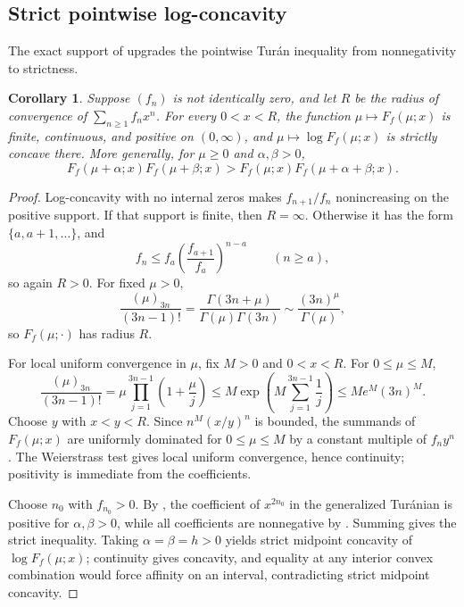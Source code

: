 \documentclass[11pt,a4paper]{amsart}
\numberwithin{equation}{section}
\theoremstyle{plain}
\newtheorem{corollary}[theorem]{Corollary}
\theoremstyle{definition}
\begin{document}
\subsection{Strict pointwise log-concavity}\label{subsec:strict-pointwise-log-concavity}

The exact support of  upgrades the pointwise Tur\'an inequality
from nonnegativity to strictness.

\begin{corollary}\label{cor:ordinary}
Suppose \((f_n)\) is not identically zero, and let \(R\) be the radius of
convergence of \(\sum_{n\ge1}f_nx^n\).  For every \(0<x<R\), the function
\(\mu\mapsto F_f(\mu;x)\) is finite, continuous, and positive on \((0,\infty)\),
and \(\mu\mapsto\log F_f(\mu;x)\) is strictly concave there.  More generally,
for \(\mu\ge0\) and \(\alpha,\beta>0\),
\[
 F_f(\mu+\alpha;x)F_f(\mu+\beta;x)
 >F_f(\mu;x)F_f(\mu+\alpha+\beta;x).
\]
\end{corollary}

\begin{proof}
Log-concavity with no internal zeros makes \(f_{n+1}/f_n\) nonincreasing on the
positive support.  If that support is finite, then \(R=\infty\).  Otherwise it
has the form \(\{a,a+1,\ldots\}\), and
\[
 f_n\le f_a\left(\frac{f_{a+1}}{f_a}\right)^{n-a}\qquad(n\ge a),
\]
so again \(R>0\).  For fixed \(\mu>0\),
\[
 \frac{(\mu)_{3n}}{(3n-1)!}
 =\frac{\Gamma(3n+\mu)}{\Gamma(\mu)\Gamma(3n)}
 \sim\frac{(3n)^\mu}{\Gamma(\mu)},
\]
so \(F_f(\mu;\cdot)\) has radius \(R\).

For local uniform convergence in \(\mu\), fix \(M>0\) and \(0<x<R\).  For
\(0\le\mu\le M\),
\[
 \frac{(\mu)_{3n}}{(3n-1)!}
 =\mu\prod_{j=1}^{3n-1}\left(1+\frac{\mu}{j}\right)
 \le M\exp\!\left(M\sum_{j=1}^{3n-1}\frac1j\right)
 \le Me^M(3n)^M.
\]
Choose \(y\) with \(x<y<R\).  Since \(n^M(x/y)^n\) is bounded, the summands of
\(F_f(\mu;x)\) are uniformly dominated for \(0\le\mu\le M\) by a constant
multiple of \(f_ny^n\).  The Weierstrass test gives local uniform convergence,
hence continuity; positivity is immediate from the coefficients.

Choose \(n_0\) with \(f_{n_0}>0\).  By , the coefficient of
\(x^{2n_0}\) in the generalized Tur\'anian is positive for
\(\alpha,\beta>0\), while all coefficients are nonnegative by .
Summing gives the strict inequality.  Taking \(\alpha=\beta=h>0\) yields strict
midpoint concavity of \(\log F_f(\mu;x)\); continuity gives concavity, and equality
at any interior convex combination would force affinity on an interval,
contradicting strict midpoint concavity.
\end{proof}
\end{document}
